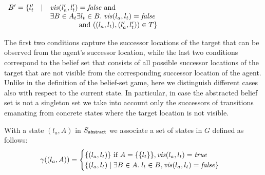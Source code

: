 \begin{itemize}
\begin{itemize}
$\begin{array}{lll}
B' = \{l_t' & \mid & \mathit{vis}(l_a',l_t') = \mathit{false} \text{ and }\\
&&\exists B \in A_t \exists l_t \in B.\; \mathit{vis}(l_a,l_t) = \mathit{false}\\ 
&&\phantom{\exists B \in A_t } \text{ and } ((l_a,l_t),(l_a',l_t')) \in T
\}
\end{array}
$
\end{itemize}
The first two conditions capture the successor locations of the target that can be observed from the agent's successor location, while the last two conditions  correspond to the belief set that consists of all possible successor locations of the target that are not visible from the corresponding successor location of the agent. Unlike in the definition of the belief-set game, here we distinguish different cases also with respect to the current state. In particular, in case the abstracted belief set is not a singleton set we take into account only the successors of transitions emanating from concrete states where the target location is not visible.

\end{itemize}



With a state $(l_a,A)$ in $S_{\mathsf{abstract}}$ we associate a set of states in $G$ defined as follows:
\[
\gamma((l_a,A)) =
\begin{cases}
\{(l_a,l_t)\} \text{ if } A = \{\{l_t\}\}, \mathit{vis}(l_a,l_t) = \mathit{true}\\
\{(l_a,l_t) \mid \exists B\in A.\; l_t \in B, \mathit{vis}(l_a,l_t) = \mathit{false}\}\\
\end{cases}
\]

